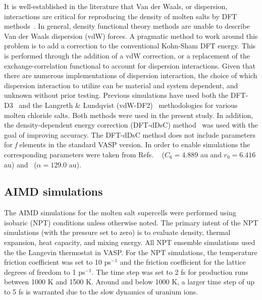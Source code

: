\documentclass[preprint,3p,10pt,onecolumn,number,sort&compress]{elsarticle}
\begin{document}
{It is well-established in the literature that Van der Waals, or dispersion, interactions are critical for reproducing the density of molten salts by DFT methods~\cite{Li,Nam2014,Nam2015}. In general, density functional theory methods are unable to describe Van der Waals dispersion (vdW) forces. A pragmatic method to work around this problem is to add a correction to the conventional Kohn-Sham DFT energy. This is performed through the addition of a vdW correction, or a replacement of the exchange-correlation functional to account for dispersion interactions. Given that there are numerous implementations of dispersion interaction, the choice of which dispersion interaction to utilize can be material and system dependent, and unknown without prior testing. Previous simulations have used both the DFT-D3~\cite{Li,Grimme} and the Langreth \& Lundqvist (vdW-DF2)~\cite{Nam2015,Dion,Klimes} methodologies for various molten chloride salts. Both methods were used in the present study. In addition, the density-dependent energy correction (DFT-dDsC) method~\cite{Steinmann2011,Steinmann2} was used with the goal of improving accuracy. The DFT-dDsC method does not include parameters for \textit{f} elements in the standard VASP version. In order to enable simulations the corresponding parameters were taken from Refs. ~\cite{Kim} ($C_6=4.889$ au and $r_0=6.416$ au) and~\cite{pol} ($\alpha=129.0$ au).} 

\subsection{AIMD simulations}
The AIMD simulations for the molten salt supercells were performed using isobaric (NPT) conditions unless otherwise noted. The primary intent of the NPT simulations (with the pressure set to zero) is to evaluate density, thermal expansion, heat capacity, and mixing energy. All NPT ensemble simulations used the the Langevin thermostat in VASP. For the NPT simulations, the temperature friction coefficient was set to 10 ps$^{-1}$ and the friction coefficient for the lattice degrees of freedom to 1 ps$^{-1}$. The time step was set to 2 fs for production runs between 1000 K and 1500 K. Around and below 1000 K, a larger time step of up to 5 fs is warranted due to the slow dynamics of uranium ions.
\end{document}
